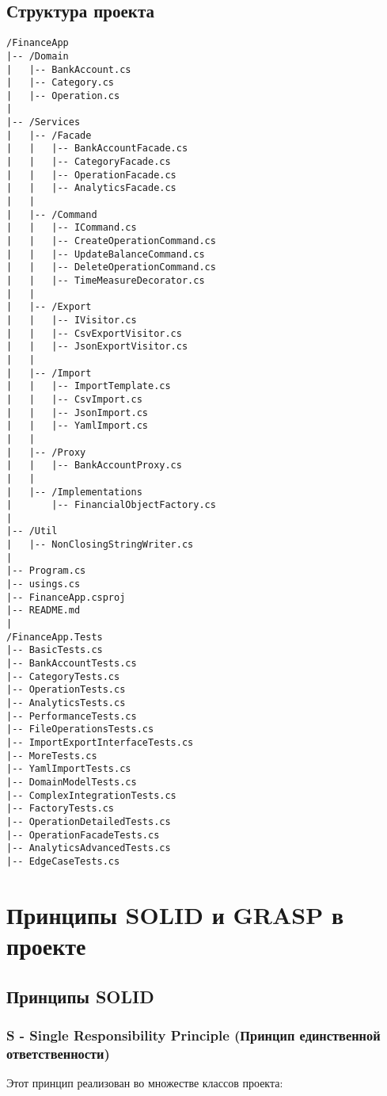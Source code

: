 \documentclass[12pt,a4paper]{article}
\begin{document}
\subsection{Структура проекта}

\begin{lstlisting}
/FinanceApp
|-- /Domain
|   |-- BankAccount.cs
|   |-- Category.cs
|   |-- Operation.cs
|
|-- /Services
|   |-- /Facade
|   |   |-- BankAccountFacade.cs
|   |   |-- CategoryFacade.cs
|   |   |-- OperationFacade.cs
|   |   |-- AnalyticsFacade.cs
|   |
|   |-- /Command
|   |   |-- ICommand.cs
|   |   |-- CreateOperationCommand.cs
|   |   |-- UpdateBalanceCommand.cs
|   |   |-- DeleteOperationCommand.cs
|   |   |-- TimeMeasureDecorator.cs
|   |
|   |-- /Export
|   |   |-- IVisitor.cs
|   |   |-- CsvExportVisitor.cs
|   |   |-- JsonExportVisitor.cs
|   |
|   |-- /Import
|   |   |-- ImportTemplate.cs
|   |   |-- CsvImport.cs
|   |   |-- JsonImport.cs
|   |   |-- YamlImport.cs
|   |
|   |-- /Proxy
|   |   |-- BankAccountProxy.cs
|   |
|   |-- /Implementations
|       |-- FinancialObjectFactory.cs
|
|-- /Util
|   |-- NonClosingStringWriter.cs
|
|-- Program.cs
|-- usings.cs
|-- FinanceApp.csproj
|-- README.md
|
/FinanceApp.Tests
|-- BasicTests.cs
|-- BankAccountTests.cs
|-- CategoryTests.cs
|-- OperationTests.cs
|-- AnalyticsTests.cs
|-- PerformanceTests.cs
|-- FileOperationsTests.cs
|-- ImportExportInterfaceTests.cs
|-- MoreTests.cs
|-- YamlImportTests.cs
|-- DomainModelTests.cs
|-- ComplexIntegrationTests.cs
|-- FactoryTests.cs
|-- OperationDetailedTests.cs
|-- OperationFacadeTests.cs
|-- AnalyticsAdvancedTests.cs
|-- EdgeCaseTests.cs
\end{lstlisting}

\section{Принципы SOLID и GRASP в проекте}

\subsection{Принципы SOLID}

\subsubsection{S - Single Responsibility Principle (Принцип единственной ответственности)}

Этот принцип реализован во множестве классов проекта:
\end{document}
